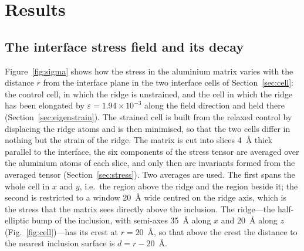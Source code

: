 \section{Results}
\label{sec:results}

\subsection{The interface stress field and its decay}
\label{sec:sigma_r}

Figure~\ref{fig:sigma} shows how the stress in the aluminium matrix varies
with the distance $r$ from the interface plane in the two interface cells of
Section~\ref{sec:cell}: the control cell, in which the ridge is unstrained,
and the cell in which the ridge has been elongated by
$\varepsilon=1.94\times10^{-3}$ along the field direction and held there
(Section~\ref{sec:eigenstrain}). The strained cell is built from the relaxed
control by displacing the ridge atoms and is then minimised, so that the two
cells differ in nothing but the strain of the ridge. The matrix is cut into
slices 4~\AA{} thick parallel to the interface, the six components of the
stress tensor are averaged over the aluminium atoms of each slice, and only
then are invariants formed from the averaged tensor
(Section~\ref{sec:stress}). Two averages are used. The first spans the whole
cell in $x$ and $y$, i.e.\ the region above the ridge and the region beside
it; the second is restricted to a window 20~\AA{} wide centred on the ridge
axis, which is the stress that the matrix sees directly above the inclusion.
The ridge---the half-elliptic bump of the inclusion, with semi-axes 35~\AA{}
along $x$ and 20~\AA{} along $z$ (Fig.~\ref{fig:cell})---has its crest at
$r=20$~\AA{}, so that above the crest the distance to the nearest inclusion
surface is $d=r-20$~\AA{}.

